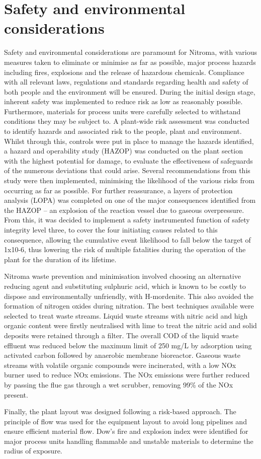 \section*{Safety and environmental considerations}

Safety and environmental considerations are paramount for Nitroma, with various measures taken to eliminate or minimise as far as possible, major process hazards including fires, explosions and the release of hazardous chemicals. Compliance with all relevant laws, regulations and standards regarding health and safety of both people and the environment will be ensured.  During the initial design stage, inherent safety was implemented to reduce risk as low as reasonably possible. Furthermore, materials for process units were carefully selected to withstand conditions they may be subject to. A plant-wide risk assessment was conducted to identify hazards and associated risk to the people, plant and environment. Whilst through this, controls were put in place to manage the hazards identified, a hazard and operability study (HAZOP) was conducted on the plant section with the highest potential for damage, to evaluate the effectiveness of safeguards of the numerous deviations that could arise. Several recommendations from this study were then implemented, minimising the likelihood of the various risks from occurring as far as possible. For further reassurance, a layers of protection analysis (LOPA) was completed on one of the major consequences identified from the HAZOP – an explosion of the reaction vessel due to gaseous overpressure.  From this, it was decided to implement a safety instrumented function of safety integrity level three, to cover the four initiating causes related to this consequence, allowing the cumulative event likelihood to fall below the target of 1x10-6, thus lowering the risk of multiple fatalities during the operation of the plant for the duration of its lifetime. 

Nitroma waste prevention and minimisation involved choosing an alternative reducing agent and substituting sulphuric acid, which is known to be costly to dispose and environmentally unfriendly, with H-mordenite. This also avoided the formation of nitrogen oxides during nitration. The best techniques available were selected to treat waste streams. Liquid waste streams with nitric acid and high organic content were firstly neutralised with lime to treat the nitric acid and solid deposits were retained through a filter. The overall COD of the liquid waste effluent was reduced below the maximum limit of 250 mg/L by adsorption using activated carbon followed by anaerobic membrane bioreactor. Gaseous waste streams with volatile organic compounds were incinerated, with a low NOx burner used to reduce NOx emissions. The NOx emissions were further reduced by passing the flue gas through a wet scrubber, removing 99\% of the NOx present. 

Finally, the plant layout was designed following a risk-based approach. The principle of flow was used for the equipment layout to avoid long pipelines and ensure efficient material flow. Dow’s fire and explosion index were identified for major process units handling flammable and unstable materials to determine the radius of exposure.  